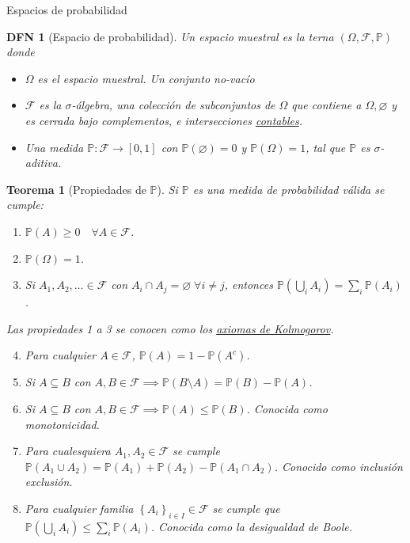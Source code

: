 \documentclass[a4paper]{article}
\title{}
\author{}
\newtheorem{definition}{DFN}
\theoremstyle{mytheoremstyle}
\newtheorem{theorem}{Teorema}
\newcommand{\IP}{\mathbb{P}}
\newcommand{\F}{\mathcal{F}}
\newcommand{\1}{\mathds{1}}
\providecommand{\set}[1]{\left\{#1\right\}}
\begin{document}
\begin{multicols*}{3}

\begin{roundbox}{Espacios de probabilidad}
\begin{definition}[Espacio de probabilidad] 
    Un espacio muestral es la terna $(\Omega, \F, \IP)$ donde
    \begin{itemize}
        \item $\Omega$ es el espacio muestral. Un conjunto no-vacío
        \item $\F$ es la $\sigma$-álgebra, una colección de subconjuntos de $\Omega$ que contiene a $\Omega, \varnothing$ y es cerrada bajo complementos, e intersecciones \underline{contables}.
        \item Una medida $\IP : \F \to [0,1]$ con $\IP(\varnothing) = 0$ y $\IP(\Omega) =1$, tal que $\IP$ es $\sigma$-aditiva.
    \end{itemize}
\end{definition}

\begin{theorem}[Propiedades de $\IP$]
    Si $\IP$ es una medida de probabilidad válida se cumple: 
    \begin{enumerate}
        \item $\IP(A) \geq 0 \quad \forall A \in \F$.
        \item $\IP(\Omega) = 1$. 
        \item Si $A_1, A_2, \dots \in \F$ con $A_i \cap A_j = \varnothing \; \forall i \neq j$, entonces $\IP(\bigcup_{i} A_i) = \sum_{i} \IP(A_i)$. 
    \end{enumerate}
    Las propiedades 1 a 3 se conocen como los \underline{axiomas de Kolmogorov}.
    \begin{enumerate}
        \setcounter{enumi}{3}
        \item Para cualquier $A \in \F$, $\IP(A) = 1 - \IP(A^c)$.
        \item Si $A \subseteq B$ con $A,B \in \F \implies \IP(B \setminus A) = \IP(B) - \IP(A)$.
        \item Si $A \subseteq B$ con $A,B \in \F \implies \IP(A) \leq \IP(B)$. Conocida como \textit{monotonicidad}.
        \item Para cualesquiera $A_1, A_2 \in \F$ se cumple $\IP(A_1 \cup A_2) = \IP(A_1) + \IP(A_2) - \IP(A_1 \cap A_2)$. Conocido como \textit{inclusión exclusión}.
        \item Para cualquier familia $\set{A_i}_{i \in I} \in \F$ se cumple que $\IP(\bigcup_i A_i) \leq \sum_{i} \IP(A_i)$. Conocida como la \textit{desigualdad de Boole}.
    \end{enumerate}
\end{theorem}
\end{roundbox}


\end{multicols*}
\end{document}

